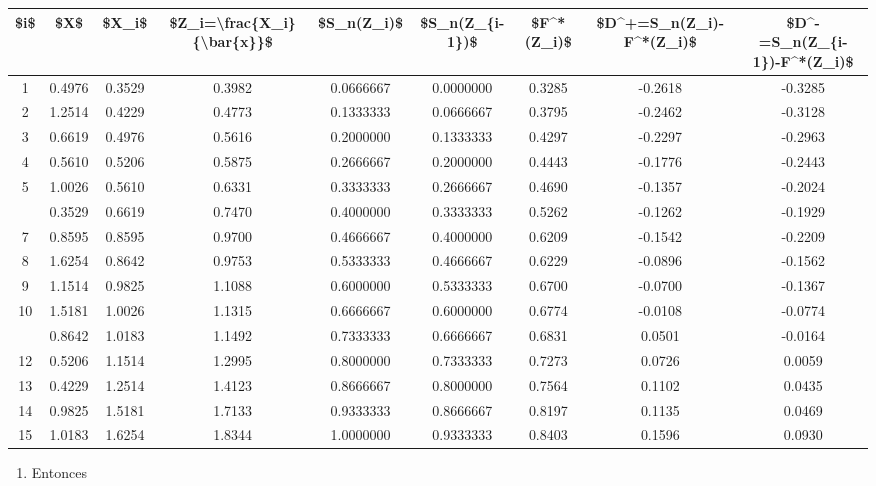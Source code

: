 \documentclass[
  a4paper,
  oneside,
  openany]{book}
\providecommand{\tightlist}{%
  \setlength{\itemsep}{0pt}\setlength{\parskip}{0pt}}
\begin{document}
\begin{table}[H]
\centering
\begin{tabular}{ccccccccc}
\toprule
\$i\$ & \$X\$ & \$X\_i\$ & \$Z\_i=\textbackslash{}frac\{X\_i\}\{\textbackslash{}bar\{x\}\}\$ & \$S\_n(Z\_i)\$ & \$S\_n(Z\_\{i-1\})\$ & \$F\textasciicircum{}*(Z\_i)\$ & \$D\textasciicircum{}+=S\_n(Z\_i)-F\textasciicircum{}*(Z\_i)\$ & \$D\textasciicircum{}-=S\_n(Z\_\{i-1\})-F\textasciicircum{}*(Z\_i)\$\\
\midrule
1 & 0.4976 & 0.3529 & 0.3982 & 0.0666667 & 0.0000000 & 0.3285 & -0.2618 & -0.3285\\
2 & 1.2514 & 0.4229 & 0.4773 & 0.1333333 & 0.0666667 & 0.3795 & -0.2462 & -0.3128\\
3 & 0.6619 & 0.4976 & 0.5616 & 0.2000000 & 0.1333333 & 0.4297 & -0.2297 & -0.2963\\
4 & 0.5610 & 0.5206 & 0.5875 & 0.2666667 & 0.2000000 & 0.4443 & -0.1776 & -0.2443\\
5 & 1.0026 & 0.5610 & 0.6331 & 0.3333333 & 0.2666667 & 0.4690 & -0.1357 & -0.2024\\
\addlinespace
6 & 0.3529 & 0.6619 & 0.7470 & 0.4000000 & 0.3333333 & 0.5262 & -0.1262 & -0.1929\\
7 & 0.8595 & 0.8595 & 0.9700 & 0.4666667 & 0.4000000 & 0.6209 & -0.1542 & -0.2209\\
8 & 1.6254 & 0.8642 & 0.9753 & 0.5333333 & 0.4666667 & 0.6229 & -0.0896 & -0.1562\\
9 & 1.1514 & 0.9825 & 1.1088 & 0.6000000 & 0.5333333 & 0.6700 & -0.0700 & -0.1367\\
10 & 1.5181 & 1.0026 & 1.1315 & 0.6666667 & 0.6000000 & 0.6774 & -0.0108 & -0.0774\\
\addlinespace
11 & 0.8642 & 1.0183 & 1.1492 & 0.7333333 & 0.6666667 & 0.6831 & 0.0501 & -0.0164\\
12 & 0.5206 & 1.1514 & 1.2995 & 0.8000000 & 0.7333333 & 0.7273 & 0.0726 & 0.0059\\
13 & 0.4229 & 1.2514 & 1.4123 & 0.8666667 & 0.8000000 & 0.7564 & 0.1102 & 0.0435\\
14 & 0.9825 & 1.5181 & 1.7133 & 0.9333333 & 0.8666667 & 0.8197 & 0.1135 & 0.0469\\
15 & 1.0183 & 1.6254 & 1.8344 & 1.0000000 & 0.9333333 & 0.8403 & 0.1596 & 0.0930\\
\bottomrule
\end{tabular}
\end{table}

\begin{enumerate}
\def\labelenumi{\arabic{enumi})}
\setcounter{enumi}{8}
\tightlist
\item
  Entonces
\end{enumerate}
\end{document}
